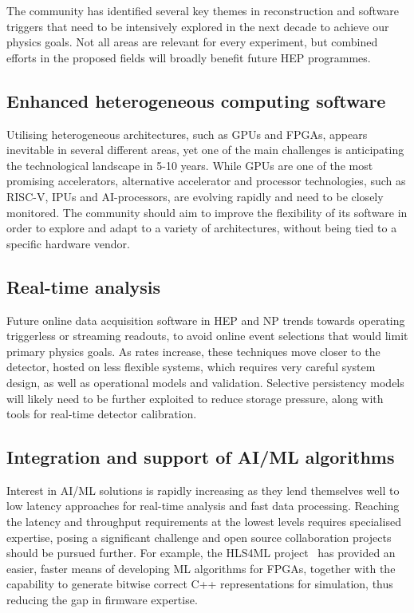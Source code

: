 \documentclass[10pt,a4paper]{article}
\begin{document}
The community has identified several key themes in reconstruction and software
triggers that need to be intensively explored in the next decade to achieve our
physics goals. Not all areas are relevant for every experiment, but combined
efforts in the proposed fields will broadly benefit future HEP programmes.

\subsection{Enhanced heterogeneous computing
software}\label{enhanced-heterogeneous-computing-software}

Utilising heterogeneous architectures, such as GPUs and FPGAs, appears
inevitable in several different areas, yet one of the main challenges is
anticipating the technological landscape in 5-10 years. While GPUs are one of
the most promising accelerators, alternative accelerator and processor
technologies, such as RISC-V, IPUs and AI-processors, are evolving rapidly and
need to be closely monitored. The community should aim to improve the
flexibility of its software in order to explore and adapt to a variety of
architectures, without being tied to a specific hardware vendor.

\subsection{Real-time analysis}\label{real-time-analysis}

Future online data acquisition software in HEP and NP trends towards operating
triggerless or streaming readouts, to avoid online event selections that would
limit primary physics goals. As rates increase, these techniques move closer
to the detector, hosted on less flexible systems, which requires very careful
system design, as well as operational models and validation. Selective
persistency models will likely need to be further exploited to reduce storage
pressure, along with tools for real-time detector calibration.

\subsection{Integration and support of AI/ML
algorithms}\label{integration-and-support-of-aiml-algorithms}

Interest in AI/ML solutions is rapidly increasing as they lend themselves well
to low latency approaches for real-time analysis and fast data processing.
Reaching the latency and throughput requirements at the lowest levels requires
specialised expertise, posing a significant challenge and open source
collaboration projects should be pursued further. For example, the HLS4ML
project~\cite{fastml_hls4ml,Duarte:2018ite} has provided an
easier, faster means of developing ML algorithms for FPGAs, together with the
capability to generate bitwise correct C++ representations for simulation,
thus reducing the gap in firmware expertise.
\end{document}
